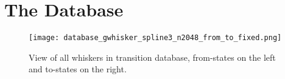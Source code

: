 \section*{The Database}

\begin{figure}
  \centering
  \texttt{[image: database\_gwhisker\_spline3\_n2048\_from\_to\_fixed.png]}
  \caption{View of all whiskers in transition database, from-states on the left and to-states on the right.}
  \label{fig:database}
\end{figure}
